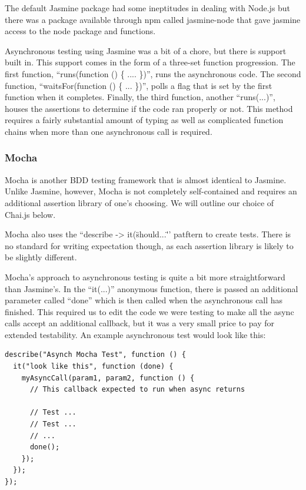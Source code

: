 \documentclass[11pt]{article}
\begin{document}
The default Jasmine package had some ineptitudes in dealing with Node.js but there was a package available through npm called jasmine-node \cite{JasmineNode} that gave jasmine access to the node package and functions. 

Asynchronous testing using Jasmine was a bit of a chore, but there is support built in. This support comes in the form of a three-set function progression. The first function, ``runs(function () \{ .... \})'', runs the asynchronous code. The second function, ``waitsFor(function () \{ ... \})'', polls a flag that is set by the first function when it completes. Finally, the third function, another ``runs(...)'', houses the assertions to determine if the code ran properly or not. This method requires a fairly substantial amount of typing as well as complicated function chains when more than one asynchronous call is required.

\subsubsection{Mocha \cite{Mocha}}
Mocha is another BDD testing framework that is almost identical to Jasmine. Unlike Jasmine, however, Mocha is not completely self-contained and requires an additional assertion library of one's choosing. We will outline our choice of Chai.js below.

Mocha also uses the ``describe -> it(\"should...\" '' patftern to create tests. There is no standard for writing expectation though, as each assertion library is likely to be slightly different.

Mocha's approach to asynchronous testing is quite a bit more straightforward than Jasmine's. In the ``it(...)'' anonymous function, there is passed an additional parameter called ``done'' which is then called when the asynchronous call has finished. This required us to edit the code we were testing to make all the async calls accept an additional callback, but it was a very small price to pay for extended testability. An example asynchronous test would look like this:
\begin{lstlisting}
describe("Asynch Mocha Test", function () {
  it("look like this", function (done) {
    myAsyncCall(param1, param2, function () {
      // This callback expected to run when async returns

      // Test ...
      // Test ...
      // ...
      done();
    });
  });
});
\end{lstlisting}

\end{document}
